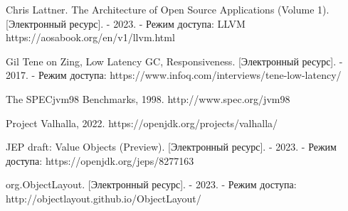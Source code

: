 \begin{flushleft}
\begin{thebibliography}{}
Chris Lattner. The Architecture of Open Source Applications (Volume 1). [Электронный ресурс]. - 2023. - Режим доступа: LLVM https://aosabook.org/en/v1/llvm.html

Gil Tene on Zing, Low Latency GC, Responsiveness. [Электронный ресурс]. - 2017. - Режим доступа: https://www.infoq.com/interviews/tene-low-latency/

The SPECjvm98 Benchmarks, 1998. http://www.spec.org/jvm98

Project Valhalla, 2022. https://openjdk.org/projects/valhalla/

JEP draft: Value Objects (Preview). [Электронный ресурс]. - 2023. - Режим доступа: https://openjdk.org/jeps/8277163

org.ObjectLayout. [Электронный ресурс]. - 2023. - Режим доступа: http://objectlayout.github.io/ObjectLayout/

\end{thebibliography}
\end{flushleft}
\endgroup

\clearpage
